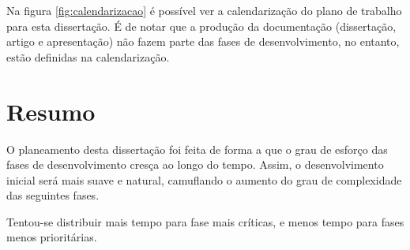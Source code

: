   Na figura \ref{fig:calendarizacao} é possível ver a calendarização do plano de trabalho para esta dissertação.
  É de notar que a produção da documentação (dissertação, artigo e apresentação) não fazem parte das fases de desenvolvimento, no entanto, estão definidas na calendarização.


\section{Resumo}

O planeamento desta dissertação foi feita de forma a que o grau de esforço das fases de desenvolvimento cresça ao longo do tempo.
Assim, o desenvolvimento inicial será mais suave e natural, camuflando o aumento do grau de complexidade das seguintes fases.

Tentou-se distribuir mais tempo para fase mais críticas, e menos tempo para fases menos prioritárias.